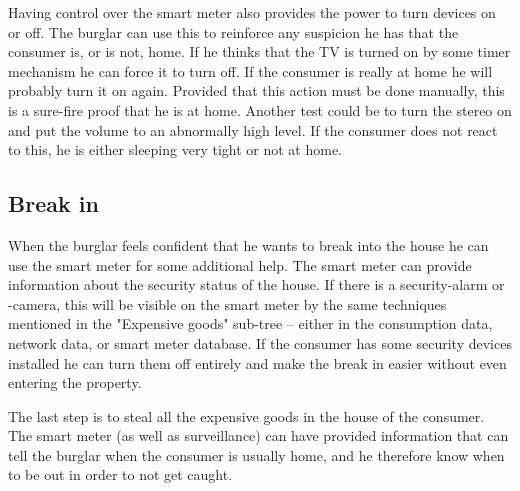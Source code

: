 Having control over the smart meter also provides the power to turn devices on or off.
The burglar can use this to reinforce any suspicion he has that the consumer is, or is not, home.
If he thinks that the TV is turned on by some timer mechanism he can force it to turn off.
If the consumer is really at home he will probably turn it on again.
Provided that this action must be done manually, this is a sure-fire proof that he is at home.
Another test could be to turn the stereo on and put the volume to an abnormally high level.
If the consumer does not react to this, he is either sleeping very tight or not at home.

\subsection{Break in}
When the burglar feels confident that he wants to break into the house he can use the smart meter for some additional help.
The smart meter can provide information about the security status of the house.
If there is a security-alarm or -camera, this will be visible on the smart meter by the same techniques mentioned in the "Expensive goods" sub-tree -- either in the consumption data, network data, or smart meter database.
If the consumer has some security devices installed he can turn them off entirely and make the break in easier without even entering the property.

The last step is to steal all the expensive goods in the house of the consumer.
The smart meter (as well as surveillance) can have provided information that can tell the burglar when the consumer is usually home, and he therefore know when to be out in order to not get caught.